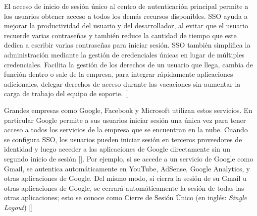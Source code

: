 El acceso de inicio de sesión único al centro de autenticación principal permite a los usuarios obtener acceso a todos los demás recursos disponibles. SSO ayuda a mejorar la productividad del usuario y del desarrollador, al evitar que el usuario recuerde varias contraseñas y también reduce la cantidad de tiempo que este dedica a escribir varias contraseñas para iniciar sesión. SSO también simplifica la administración mediante la gestión de credenciales únicas en lugar de múltiples credenciales. Facilita la gestión de los derechos de un usuario que llega, cambia de función dentro o sale de la empresa, para integrar rápidamente aplicaciones adicionales, delegar derechos de acceso durante las vacaciones sin aumentar la carga de trabajo del equipo de soporte. [\cite{radha2012survey}]

Grandes empresas como Google, Facebook y Microsoft utilizan estos servicios. En particular Google permite a sus usuarios iniciar sesión una única vez para tener acceso a todos los servicios de la empresa que se encuentran en la nube. Cuando se configura SSO, los usuarios pueden iniciar sesión en terceros proveedores de identidad y luego acceder a las aplicaciones de Google directamente sin un segundo inicio de sesión [\cite{google-support}]. Por ejemplo, si se accede a un servicio de Google como Gmail, se autentica automáticamente en YouTube, AdSense, Google Analytics, y otras aplicaciones de Google. Del mismo modo, si cierra la sesión de su Gmail u otras aplicaciones de Google, se cerrará automáticamente la sesión de todas las otras aplicaciones; esto se conoce como Cierre de Sesión Único (en inglés: \textit{Single Logout}) [\cite{sso-doc}]

